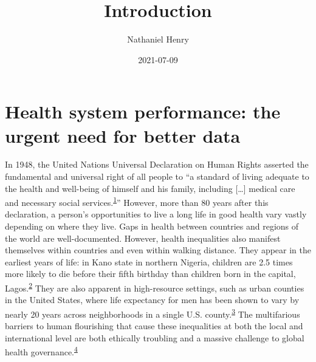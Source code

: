 \documentclass[
]{article}
\title{Introduction}
\author{Nathaniel Henry\textsuperscript{}}
\date{2021-07-09}
\begin{document}
\maketitle

\hypertarget{health-system-performance-the-urgent-need-for-better-data}{%
\section{Health system performance: the urgent need for better data}\label{health-system-performance-the-urgent-need-for-better-data}}

In 1948, the United Nations Universal Declaration on Human Rights asserted the fundamental and universal right of all people to ``a standard of living adequate to the health and well-being of himself and his family, including {[}\ldots{]} medical care and necessary social services.\textsuperscript{\protect\hyperlink{ref-UNGeneralAssembly1948}{1}}'' However, more than 80 years after this declaration, a person's opportunities to live a long life in good health vary vastly depending on where they live. Gaps in health between countries and regions of the world are well-documented. However, health inequalities also manifest themselves within countries and even within walking distance. They appear in the earliest years of life: in Kano state in northern Nigeria, children are 2.5 times more likely to die before their fifth birthday than children born in the capital, Lagos.\textsuperscript{\protect\hyperlink{ref-Burstein2019}{2}} They are also apparent in high-resource settings, such as urban counties in the United States, where life expectancy for men has been shown to vary by nearly 20 years across neighborhoods in a single U.S. county.\textsuperscript{\protect\hyperlink{ref-Dwyer-Lindgren2017}{3}} The multifarious barriers to human flourishing that cause these inequalities at both the local and international level are both ethically troubling and a massive challenge to global health governance.\textsuperscript{\protect\hyperlink{ref-Ruger2006}{4}}
\end{document}
